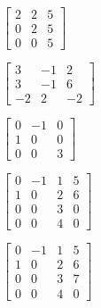 \begin{oppgave}
\begin{punkt}
$
\begin{bmatrix}
2 & 2 & 5\\
0 & 2 & 5\\
0 & 0 & 5
\end{bmatrix}
$ 
\end{punkt}
%
%
%
%
%
%
%
%
%
%
\begin{punkt}
$\begin{bmatrix}
3 & -1 & 2\\
3 & -1 & 6\\
-2 & 2 & -2
\end{bmatrix}$
\end{punkt}

\begin{punkt}
$\begin{bmatrix}
0 & -1 & 0\\
1 & 0 & 0\\
0 & 0 & 3
\end{bmatrix}$
\end{punkt}



\begin{punkt}
$\begin{bmatrix}
0 & -1 & 1& 5\\
1 & 0 & 2& 6\\
0 & 0 & 3 & 0\\
0 & 0 & 4 & 0
\end{bmatrix}$
\end{punkt}


\begin{punkt}
$\begin{bmatrix}
0 & -1 & 1& 5\\
1 & 0 & 2& 6\\
0 & 0 & 3 & 7\\
0 & 0 & 4 & 0
\end{bmatrix}$
\end{punkt}

\end{oppgave}


